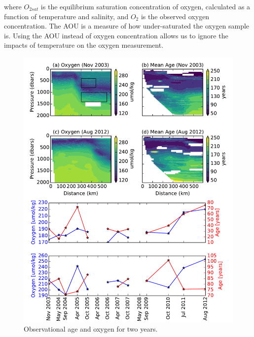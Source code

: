 where $O_{2 sat}$ is the equilibrium saturation concentration of oxygen, calculated as a function of temperature and salinity, and $O_2$ is the observed oxygen concentration. The AOU is a measure of how under-saturated the oxygen sample is. Using the AOU instead of oxygen concentration allows us to ignore the impacts of temperature on the oxygen measurement.


\begin{figure}
\centering
\includegraphics[width=\linewidth]{age_oxygen_ts.pdf}
\caption{Observational age and oxygen for two years.}
\label{fig:fig2}
\end{figure}


